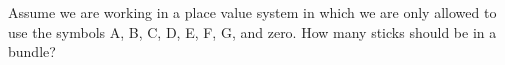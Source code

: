 \documentclass{ximera}
\begin{document}
\begin{question}
Assume we are working in a place value system in which we are only allowed to use the symbols A, B, C, D, E, F, G, and zero.  How many sticks should be in a bundle?  

\begin{multipleChoice}


\end{multipleChoice}



\end{question}
\end{document}
